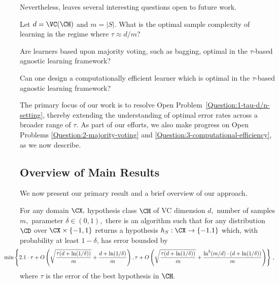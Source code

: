 Nevertheless, \citet{hanneke2024revisiting} leaves several interesting questions open to future work. 

\begin{problem} \label{Question:1-tau-d/n-setting} 
Let $d = \VC(\CH)$ and $m = |S|$. What is the optimal sample complexity of learning in the regime where $\tau \approx d / m$? 
\end{problem}

\begin{problem} \label{Question:2-majority-voting}
Are learners based upon majority voting, such as bagging, optimal in the \linebreak $\tau$-based agnostic learning framework?
\end{problem}
    
\begin{problem} \label{Question:3-computational-efficiency}
Can one design a computationally efficient learner which is optimal in the \linebreak $\tau$-based agnostic learning framework? 
\end{problem}

The primary focus of our work is to resolve Open Problem~\ref{Question:1-tau-d/n-setting}, thereby extending the understanding of optimal error rates across a broader range of $\tau$. As part of our efforts, we also make progress on Open Problems \ref{Question:2-majority-voting} and \ref{Question:3-computational-efficiency}, as we now describe. 

\subsection{Overview of Main Results}

We now present our primary result and a brief overview of our approach. 

\begin{theorem}\label{thm:main-result}
    For any domain $\CX,$ hypothesis class $\CH$ of VC dimension $d,$ number of samples $m,$
    parameter $\delta \in (0,1),$
    there is an algorithm such that for any
    distribution $\CD$ over $\CX \times \{-1,1\}$ returns a hypothesis $h_S: \CX \rightarrow \{-1.1\}$ which, with probability at least $1-\delta$, has error bounded by
    \[ \hspace{-1 cm}
        \min \left\{  2.1 \cdot \tau + O\left(\sqrt{\frac{\tau(d + \ln(1/\delta))}{m}} + \frac{d + \ln(1/\delta)}{m} \right),  \tau + O\left(\sqrt{\frac{\tau(d + \ln(1/\delta))}{m}} + \frac{\ln^5(m/d)\cdot(d + \ln(1/\delta))}{m} \right) \right\} \,,
    \]
    where $\tau$ is the error of the best hypothesis in $\CH.$
\end{theorem}

